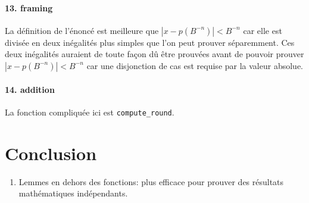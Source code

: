 \documentclass[a4paper]{article}%
\begin{document}
	\paragraph{13. framing} La définition de l'énoncé est meilleure que $|x - p(B^{-n})| < B^{-n}$ car elle
	est divisée en deux inégalités plus simples que l'on peut prouver séparemment.
	Ces deux inégalités auraient de toute façon dû être prouvées avant de pouvoir prouver $|x - p(B^{-n})| < B^{-n}$
	car une disjonction de cas est requise par la valeur absolue.

	\paragraph{14. addition} La fonction compliquée ici est \texttt{compute_round}.
	

	\section{Conclusion}
		
	\begin{enumerate}
		\item Lemmes en dehors des fonctions: plus efficace pour prouver des résultats mathématiques indépendants.
	\end{enumerate}
\end{document}

